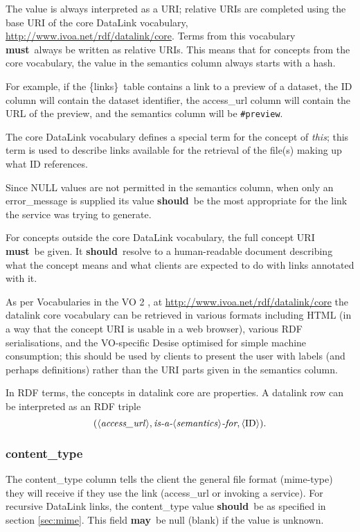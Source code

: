 \documentclass[11pt,a4paper]{ivoa}
\newcommand{\blinks}{\{links\}}
\newcommand{\rfcmust}{\textbf{must}}
\newcommand{\rfcshould}{\textbf{should}}
\newcommand{\rfcmay}{\textbf{may}}
\begin{document}
The value is always interpreted as a URI; relative URIs
\citep{std:RFC3986} are completed using the base URI of the
core DataLink vocabulary,
\url{http://www.ivoa.net/rdf/datalink/core}.  Terms from this
vocabulary \rfcmust\ always be written as relative URIs.  This means that for
concepts from the core vocabulary, the value in the semantics column
always starts with a hash.

For example, if the \blinks\ table contains a
link to a preview of a dataset, the ID column will contain the dataset
identifier, the access\_url column will contain the URL of the preview,
and the semantics column will be \verb|#preview|.

The core DataLink vocabulary defines a special term for
the concept of {\em this\/};
this term is used to describe links available for the retrieval of the
file(s) making up what ID references.

Since NULL values are not permitted in the semantics column, when only
an error\_message is supplied its value \rfcshould\ be the most appropriate
for the link the service was trying to generate.

For concepts outside the core DataLink vocabulary, the full concept URI
\rfcmust\ be given.  It \rfcshould\ resolve to a human-readable document
describing what the concept means and what clients are expected to do
with links annotated with it.

As per Vocabularies in the VO 2 \citep{2021ivoa.spec.0525D}, at
\url{http://www.ivoa.net/rdf/datalink/core} the datalink core vocabulary
can be retrieved in various formats including HTML (in a way that the
concept URI is usable in a web browser), various RDF serialisations, and
the VO-specific Desise optimised for simple machine consumption; this
should be used by clients to present the user with labels (and perhaps
definitions) rather than the URI parts given in the semantics column.

In RDF terms, the concepts in datalink core are properties.  A datalink
row can be interpreted as an RDF triple 
$$(
\langle\textit{access\_url\/}\rangle,
\textit{is-a-}\langle\textit{semantics\/}\rangle\textit{-for},
\langle\textrm{ID}\rangle
).$$

\subsubsection{content\_type}

The content\_type column tells the client the general file format
(mime-type) they will receive if they use the link
(access\_url or invoking a service).
For recursive DataLink links, the content\_type value \rfcshould\
be as specified in section \ref{sec:mime}.
This field \rfcmay\ be null (blank) if the value is unknown.
\end{document}
